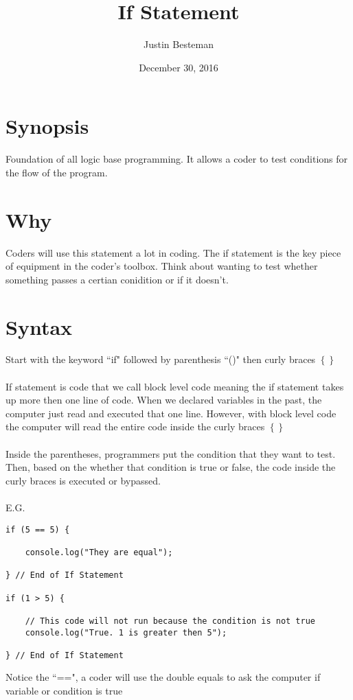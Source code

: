 \documentclass[12pt, letterpaper]{article}
\title{If Statement}
\author{Justin Besteman}
\date{December 30, 2016}
\begin{document}
\maketitle


\section*{Synopsis}

Foundation of all logic base programming. It allows a coder to test conditions for the flow of the program.

\section*{Why}

Coders will use this statement a lot in coding. The if statement is the key piece of equipment in the coder's toolbox. Think about wanting to test whether something passes a certian conidition or if it doesn't.

\section*{Syntax}

Start with the keyword ``if" followed by parenthesis ``()" then curly braces $\left\{\right\}$ \\ \\
If statement is code that we call block level code meaning the if statement takes up more then one line of code. When we declared variables in the past, the computer just read and executed that one line. However, with block level code the computer will read the entire code inside the curly braces $\left\{\right\}$ \\ \\
Inside the parentheses, programmers put the condition that they want to test. Then, based on the whether that condition is true or false, the code inside the curly braces is executed or bypassed. \\ \\
E.G.\\
\begin{lstlisting}
if (5 == 5) {

	console.log("They are equal");

} // End of If Statement

if (1 > 5) {

	// This code will not run because the condition is not true
	console.log("True. 1 is greater then 5");

} // End of If Statement
\end{lstlisting}
Notice the  ``==", a coder will use the double equals to ask the computer if variable or condition is true 
\end{document}
